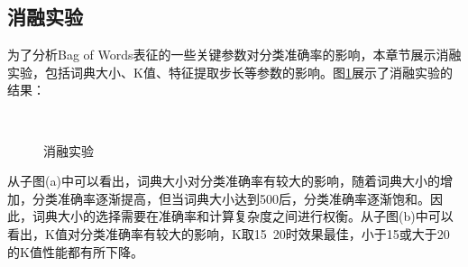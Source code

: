 \subsection{消融实验}

为了分析Bag of Words表征的一些关键参数对分类准确率的影响，本章节展示消融实验，包括词典大小、K值、特征提取步长等参数的影响。图\ref{fig:ablation}展示了消融实验的结果：

\begin{figure}[H]
    \centering
    \\
    \caption{消融实验}
    \label{fig:ablation}
\end{figure}

从子图(a)中可以看出，词典大小对分类准确率有较大的影响，随着词典大小的增加，分类准确率逐渐提高，但当词典大小达到500后，分类准确率逐渐饱和。因此，词典大小的选择需要在准确率和计算复杂度之间进行权衡。从子图(b)中可以看出，K值对分类准确率有较大的影响，K取15~20时效果最佳，小于15或大于20的K值性能都有所下降。

